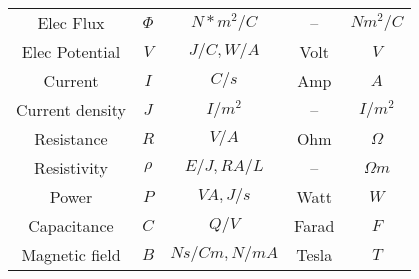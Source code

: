 \documentclass{article}
\begin{document}
\begin{large}
\begin{tabular}{ c c c c c }
Elec Flux 		& $\Phi$ 		& $N*m^2/C$ 	& -- 			& $Nm^2/C$ \\
Elec Potential	& $V$ 		& $J/C, W/A$	& Volt		& $V$ \\
Current		& $I$			& $C/s$		& Amp		& $A$ \\
Current density	& $J$		& $I/m^2$		& --			& $I/m^2$ \\
Resistance		& $R$		& $V/A$		& Ohm		& $\Omega$ \\
Resistivity		& $\rho$		& $E/J, RA/L$	& -- 			& $\Omega m$ \\
Power		& $P$		& $VA, J/s$	& Watt		& $W$ \\
Capacitance 	& $C$		& $Q/V$		& Farad		& $F$ \\
Magnetic field	& $B$		& $Ns/Cm,N/mA$	& Tesla	& $T$

\end{tabular}

\end{large}
\end{document}
